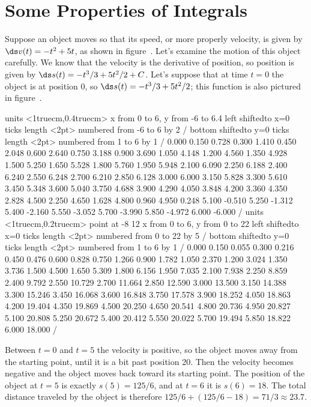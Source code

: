 \section{Some Properties of Integrals}{}{}
\nobreak
Suppose an object moves so that its speed, or more properly velocity,
is given by $\ds v(t)=-t^2+5t$, as shown in figure~. Let's examine the motion of this object carefully. We know
that the velocity is the derivative of position, so position is 
given by $\ds s(t)=-t^3/3+5t^2/2+C$. Let's suppose that at time $t=0$ the
object is at position 0, so $\ds s(t)=-t^3/3+5t^2/2$; this function is
also pictured in figure~.

\figure
\vbox{\beginpicture
\normalgraphs
\ninepoint
\setcoordinatesystem units <1truecm,0.4truecm>
\setplotarea x from 0 to 6, y from -6 to 6.4
\axis left shiftedto x=0 ticks length <2pt> numbered from -6 to 6 by 2 /
\axis bottom shiftedto y=0 ticks length <2pt> numbered from 1 to 6 by 1 /
\setquadratic
{} 0.000 0.150 0.728 0.300 1.410 0.450 2.048 0.600 2.640 
0.750 3.188 0.900 3.690 1.050 4.148 1.200 4.560 1.350 4.928 
1.500 5.250 1.650 5.528 1.800 5.760 1.950 5.948 2.100 6.090 
2.250 6.188 2.400 6.240 2.550 6.248 2.700 6.210 2.850 6.128 
3.000 6.000 3.150 5.828 3.300 5.610 3.450 5.348 3.600 5.040 
3.750 4.688 3.900 4.290 4.050 3.848 4.200 3.360 4.350 2.828 
4.500 2.250 4.650 1.628 4.800 0.960 4.950 0.248 5.100 -0.510 
5.250 -1.312 5.400 -2.160 5.550 -3.052 5.700 -3.990 5.850 -4.972 
6.000 -6.000  /
\setcoordinatesystem units <1truecm,0.2truecm> point at -8 12
\setplotarea x from 0 to 6, y from 0 to 22
\axis left shiftedto x=0 ticks length <2pt> numbered from 0 to 22 by 5 /
\axis bottom shiftedto y=0 ticks length <2pt> numbered from 1 to 6 by 1 /
\setquadratic
{} 0.000 0.150 0.055 0.300 0.216 0.450 0.476 0.600 0.828 
0.750 1.266 0.900 1.782 1.050 2.370 1.200 3.024 1.350 3.736 
1.500 4.500 1.650 5.309 1.800 6.156 1.950 7.035 2.100 7.938 
2.250 8.859 2.400 9.792 2.550 10.729 2.700 11.664 2.850 12.590 
3.000 13.500 3.150 14.388 3.300 15.246 3.450 16.068 3.600 16.848 
3.750 17.578 3.900 18.252 4.050 18.863 4.200 19.404 4.350 19.869 
4.500 20.250 4.650 20.541 4.800 20.736 4.950 20.827 5.100 20.808 
5.250 20.672 5.400 20.412 5.550 20.022 5.700 19.494 5.850 18.822 
6.000 18.000  /
\endpicture}

Between $t=0$ and $t=5$ the velocity is positive, so the object moves
away from the starting point, until it is a bit past position 20. Then
the velocity becomes negative and the object moves back toward its
starting point. The position of the object at $t=5$ is exactly 
$s(5)=125/6$, and at $t=6$ it is $s(6)=18$. The total distance
traveled by the object is therefore $125/6 + (125/6 - 18) =
71/3\approx 23.7$. 

